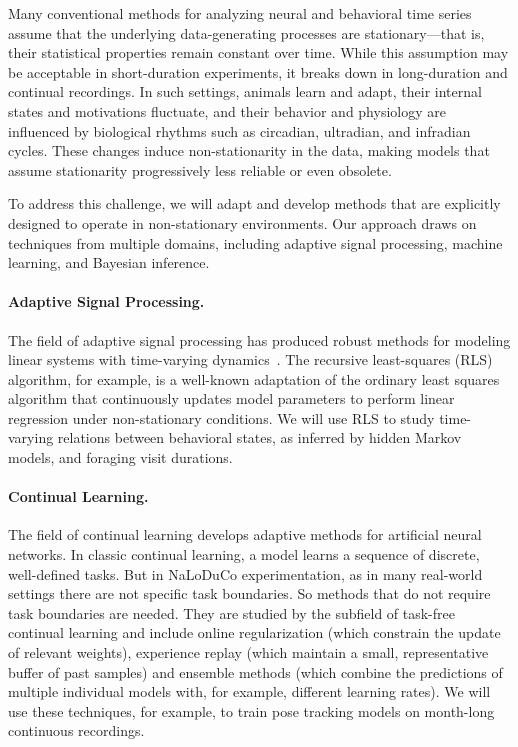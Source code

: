 
Many conventional methods for analyzing neural and behavioral time series
assume that the underlying data-generating processes are stationary—that is,
their statistical properties remain constant over time. While this assumption
may be acceptable in short-duration experiments, it breaks down in
long-duration and continual recordings. In such settings, animals
learn and adapt, their internal states and motivations fluctuate, and their
behavior and physiology are influenced by biological rhythms such as circadian,
ultradian, and infradian cycles. These changes induce non-stationarity in the
data, making models that assume stationarity progressively less reliable or
even obsolete.

To address this challenge, we will adapt and develop methods that are
explicitly designed to operate in non-stationary environments. Our approach
draws on techniques from multiple domains, including adaptive signal
processing, machine learning, and Bayesian inference.

\paragraph{Adaptive Signal Processing.}

The field of adaptive signal processing has produced robust methods for
modeling linear systems with time-varying dynamics~\citep{haykin02}.
%
The recursive least-squares (RLS) algorithm, for example, is a well-known
adaptation of the ordinary least squares algorithm that continuously updates
model parameters to perform linear regression under non-stationary conditions.
%
We will use RLS to study time-varying relations between
behavioral states, as inferred by hidden Markov models, and foraging visit
durations.

\paragraph{Continual Learning.}

The field of continual learning develops adaptive methods for
artificial neural networks.  In classic continual learning, a model learns a
sequence of discrete, well-defined tasks.  But in NaLoDuCo experimentation, as
in many real-world settings there are not specific task boundaries. So methods
that do not require task boundaries are needed. They are studied by the
subfield of task-free continual learning and include online
regularization (which constrain the update of relevant weights), experience
replay (which maintain a small, representative buffer of past samples) and
ensemble methods (which combine the predictions of multiple individual models
with, for example, different learning rates).
%
We will use these techniques, for example, to train pose tracking models on
month-long continuous recordings.

